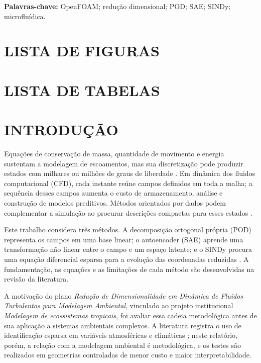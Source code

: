 \documentclass[12pt,a4paper]{article}
\begin{document}
\noindent\textbf{Palavras-chave:} OpenFOAM; redução dimensional; POD; SAE; SINDy; microfluídica.

\clearpage
\section*{LISTA DE FIGURAS}
\listoffigures

\clearpage
\section*{LISTA DE TABELAS}
\listoftables

\clearpage{}\setcounter{page}{1}
\section{INTRODUÇÃO}
Equações de conservação de massa, quantidade de movimento e energia sustentam a modelagem de escoamentos, mas sua discretização pode produzir estados com milhares ou milhões de graus de liberdade \cite{pritchard2011,tu2008}. Em dinâmica dos fluidos computacional (CFD), cada instante reúne campos definidos em toda a malha; a sequência desses campos aumenta o custo de armazenamento, análise e construção de modelos preditivos. Métodos orientados por dados podem complementar a simulação ao procurar descrições compactas para esses estados \cite{bruntonKutz2019,mendez2023}.

Este trabalho considera três métodos. A decomposição ortogonal própria (POD) representa os campos em uma base linear; o autoencoder (SAE) aprende uma transformação não linear entre o campo e um espaço latente; e o SINDy procura uma equação diferencial esparsa para a evolução das coordenadas reduzidas \cite{sirovich1987,hinton2006,brunton2016}. A fundamentação, as equações e as limitações de cada método são desenvolvidas na revisão da literatura.

A motivação do plano \textit{Redução de Dimensionalidade em Dinâmica de Fluidos Turbulentos para Modelagem Ambiental}, vinculado ao projeto institucional \textit{Modelagem de ecossistemas tropicais}, foi avaliar essa cadeia metodológica antes de sua aplicação a sistemas ambientais complexos. A literatura registra o uso de identificação esparsa em variáveis atmosféricas e climáticas \cite{diaz2023,regis2023,zhong2024}; neste relatório, porém, a relação com a modelagem ambiental é metodológica, e os testes são realizados em geometrias controladas de menor custo e maior interpretabilidade.
\end{document}
